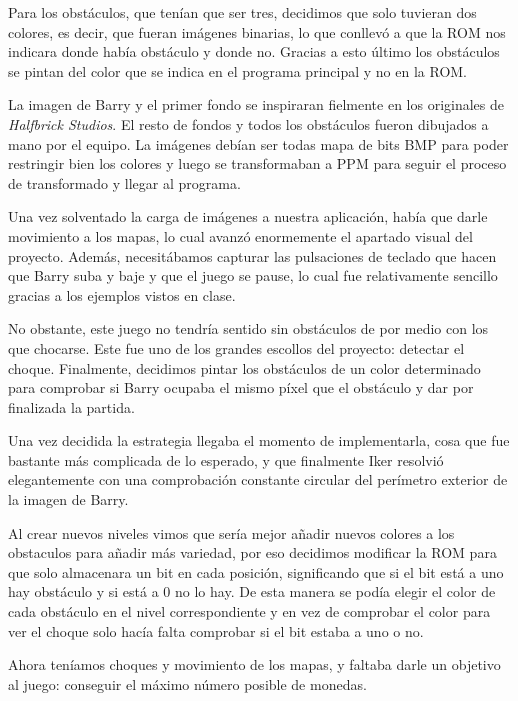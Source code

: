 \documentclass[11pt, a4paper, spanish, openright, twoside]{book}
\begin{document}
Para los obstáculos, que tenían que ser tres, decidimos que solo tuvieran dos colores, es decir, que fueran imágenes binarias, lo que conllevó a que la ROM nos indicara donde había obstáculo y donde no. Gracias a esto último los obstáculos se pintan del color que se indica en el programa principal y no en la ROM.

La imagen de Barry y el primer fondo se inspiraran fielmente en los originales de \emph{Halfbrick Studios}. El resto de fondos y todos los obstáculos fueron dibujados a mano por el equipo. La imágenes debían ser todas mapa de bits BMP para poder restringir bien los colores y luego se transformaban a PPM para seguir el proceso de transformado y llegar al programa.

Una vez solventado la carga de imágenes a nuestra aplicación, había que darle movimiento a los mapas, lo cual avanzó enormemente el apartado visual del proyecto.
Además, necesitábamos capturar las pulsaciones de teclado que hacen que Barry suba y baje y que el juego se pause, lo cual fue relativamente sencillo gracias a los ejemplos vistos en clase.


No obstante, este juego no tendría sentido sin obstáculos de por medio con los que chocarse.
Este fue uno de los grandes escollos del proyecto: detectar el choque.
Finalmente, decidimos pintar los obstáculos de un color determinado para comprobar si Barry ocupaba el mismo píxel que el obstáculo y dar por finalizada la partida.

Una vez decidida la estrategia llegaba el momento de implementarla, cosa que fue bastante más complicada de lo esperado, y que finalmente Iker resolvió elegantemente con una comprobación constante circular del perímetro exterior de la imagen de Barry.


Al crear nuevos niveles vimos que sería mejor añadir nuevos colores a los obstaculos para añadir más variedad, por eso decidimos modificar la ROM para que solo almacenara un bit en cada posición, significando que si el bit está a uno hay obstáculo y si está a 0 no lo hay. De esta manera se podía elegir el color de cada obstáculo en el nivel correspondiente y en vez de comprobar el color para ver el choque solo hacía falta comprobar si el bit estaba a uno o no. 


Ahora teníamos choques y movimiento de los mapas, y faltaba darle un objetivo al juego: conseguir el máximo número posible de monedas.
\end{document}
